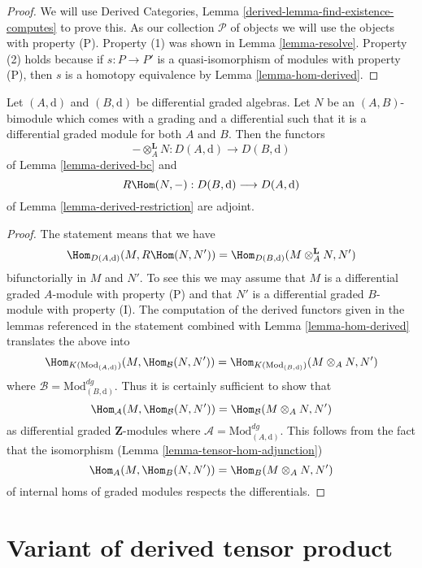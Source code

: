 \begin{proof}
We will use
Derived Categories, Lemma \ref{derived-lemma-find-existence-computes}
to prove this. As our collection $\mathcal{P}$
of objects we will use the objects with property (P).
Property (1) was shown in Lemma \ref{lemma-resolve}.
Property (2) holds because if $s : P \to P'$ is a quasi-isomorphism
of modules with property (P), then $s$ is a homotopy equivalence
by Lemma \ref{lemma-hom-derived}.
\end{proof}

\begin{lemma}
\label{lemma-tensor-hom-adjoint}
Let $(A, \text{d})$ and $(B, \text{d})$ be differential graded algebras.
Let $N$ be an $(A, B)$-bimodule which comes with a grading and a differential
such that it is a differential graded module for both $A$ and $B$.
Then the functors
$$
- \otimes_A^\mathbf{L} N : D(A, \text{d}) \longrightarrow D(B, \text{d})
$$
of Lemma \ref{lemma-derived-bc} and
$$
R\Hom(N, -) : D(B, \text{d}) \longrightarrow D(A, \text{d})
$$
of Lemma \ref{lemma-derived-restriction} are adjoint.
\end{lemma}

\begin{proof}
The statement means that we have
$$
\Hom_{D(A, \text{d})}(M, R\Hom(N, N')) =
\Hom_{D(B, \text{d})}(M \otimes^\mathbf{L}_A N, N')
$$
bifunctorially in $M$ and $N'$. To see this we may assume that $M$
is a differential graded $A$-module with property (P) and that $N'$
is a differential graded $B$-module with property (I). The computation
of the derived functors given in the lemmas referenced in the statement
combined with Lemma \ref{lemma-hom-derived} translates the above into
$$
\Hom_{K(\text{Mod}_{(A, \text{d})})}(M, \Hom_\mathcal{B}(N, N')) =
\Hom_{K(\text{Mod}_{(B, \text{d})})}(M \otimes_A N, N')
$$
where $\mathcal{B} = \text{Mod}^{dg}_{(B, \text{d})}$. Thus it is certainly
sufficient to show that
$$
\Hom_\mathcal{A}(M, \Hom_\mathcal{B}(N, N')) =
\Hom_\mathcal{B}(M \otimes_A N, N')
$$
as differential graded $\mathbf{Z}$-modules where
$\mathcal{A} = \text{Mod}^{dg}_{(A, \text{d})}$.
This follows from the fact that the isomorphism
(Lemma \ref{lemma-tensor-hom-adjunction})
$$
\Hom_A(M, \Hom_B(N, N')) = \Hom_B(M \otimes_A N, N')
$$
of internal homs of graded modules respects the differentials.
\end{proof}




\section{Variant of derived tensor product}
\label{section-variant-base-change}

